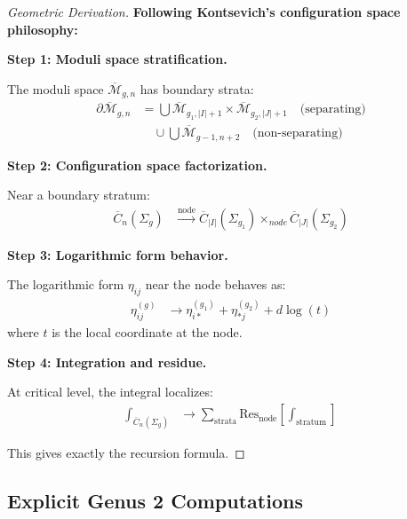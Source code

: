 \begin{proof}[Geometric Derivation]
\textbf{Following Kontsevich's configuration space philosophy:}

\textbf{Step 1: Moduli space stratification.}

The moduli space $\overline{\mathcal{M}}_{g,n}$ has boundary strata:
\begin{align}
\partial\overline{\mathcal{M}}_{g,n} &= \bigcup \overline{\mathcal{M}}_{g_1,|I|+1} \times \overline{\mathcal{M}}_{g_2,|J|+1} \quad \text{(separating)}\\
&\quad \cup \bigcup \overline{\mathcal{M}}_{g-1,n+2} \quad \text{(non-separating)}
\end{align}

\textbf{Step 2: Configuration space factorization.}

Near a boundary stratum:
\begin{align}
\overline{C}_n(\Sigma_g) &\xrightarrow{\text{node}} \overline{C}_{|I|}(\Sigma_{g_1}) \times_{node} \overline{C}_{|J|}(\Sigma_{g_2})
\end{align}

\textbf{Step 3: Logarithmic form behavior.}

The logarithmic form $\eta_{ij}$ near the node behaves as:
\begin{align}
\eta_{ij}^{(g)} &\to \eta_{i*}^{(g_1)} + \eta_{*j}^{(g_2)} + d\log(t)
\end{align}
where $t$ is the local coordinate at the node.

\textbf{Step 4: Integration and residue.}

At critical level, the integral localizes:
\begin{align}
\int_{\overline{C}_n(\Sigma_g)} &\to \sum_{\text{strata}} \text{Res}_{\text{node}} \left[\int_{\text{stratum}}\right]
\end{align}

This gives exactly the recursion formula.
\end{proof}

\subsection{Explicit Genus 2 Computations}

